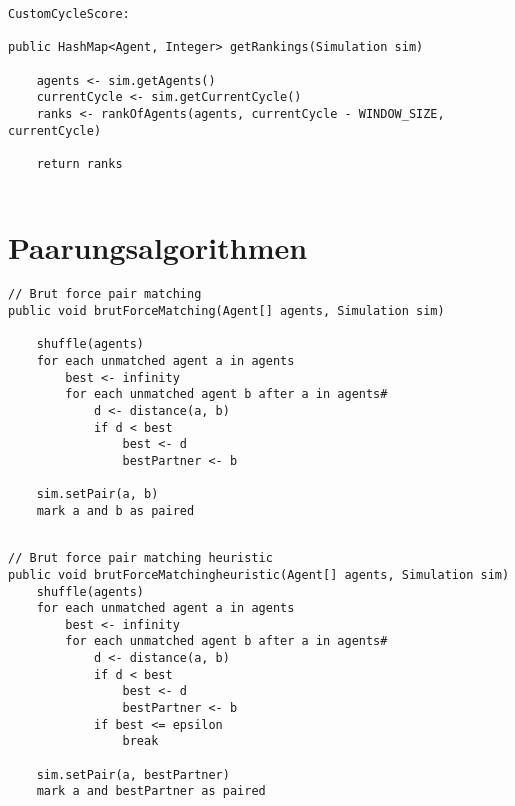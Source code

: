 \begin{lstlisting}
CustomCycleScore:

public HashMap<Agent, Integer> getRankings(Simulation sim) 
	
	agents <- sim.getAgents()
	currentCycle <- sim.getCurrentCycle()
	ranks <- rankOfAgents(agents, currentCycle - WINDOW_SIZE, currentCycle)
	
	return ranks
	
\end{lstlisting}



\section{Paarungsalgorithmen}

\begin{lstlisting}
// Brut force pair matching
public void brutForceMatching(Agent[] agents, Simulation sim) 

	shuffle(agents)
	for each unmatched agent a in agents
		best <- infinity
		for each unmatched agent b after a in agents#
			d <- distance(a, b)
			if d < best
				best <- d
				bestPartner <- b
				
	sim.setPair(a, b)
	mark a and b as paired		
	
\end{lstlisting}


\begin{lstlisting}
// Brut force pair matching heuristic
public void brutForceMatchingheuristic(Agent[] agents, Simulation sim) 
	shuffle(agents)
	for each unmatched agent a in agents
		best <- infinity
		for each unmatched agent b after a in agents#
			d <- distance(a, b)			
			if d < best
				best <- d
				bestPartner <- b
			if best <= epsilon
				break			
						
	sim.setPair(a, bestPartner)
	mark a and bestPartner as paired		
	
\end{lstlisting}